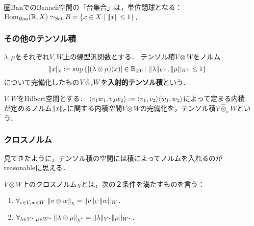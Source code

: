 \documentclass[uplatex,dvipdfmx]{jsreport}
\begin{document}
\begin{lemma}
    圏BanでのBanach空間の「台集合」は，単位閉球となる：
    $\mathrm{Hom}_{\mathrm{Ban}}(\mathbb{R},X)\simeq_{\mathrm{Set}} B=\left\{x\in X\mid\|x\|\le 1\right\}$．
\end{lemma}

\subsubsection{その他のテンソル積}

\begin{definition}
    $\lambda,\mu$をそれぞれ$V,W$上の線型汎関数とする．
    テンソル積$V\otimes W$をノルム
    \[\|x\|_\epsilon:=\sup\left\{\lvert(\lambda\otimes\mu)(x)\rvert\in\mathbb{R}_{\ge 0}\;\middle|\;\|\lambda\|_{V^*},\|\mu\|_{W^*}\le 1\right\}\]
    について完備化したもの$V\hat{\otimes}_\epsilon W$を\textbf{入射的テンソル積}という．
\end{definition}

\begin{definition}
    $V,W$をHilbert空間とする．
    $\langle v_1w_1,v_2w_2\rangle:=\langle v_1,v_2\rangle\langle w_1,w_2\rangle$によって定まる内積が定めるノルム$\|x\|_\sigma$に関する内積空間$V\otimes W$の完備化を，テンソル積$V\hat{\otimes}_\sigma W$という．
\end{definition}

\subsubsection{クロスノルム}

\begin{tcolorbox}[colframe=ForestGreen, colback=ForestGreen!10!white,breakable,colbacktitle=ForestGreen!40!white,coltitle=black,fonttitle=\bfseries\sffamily,
title=]
    見てきたように，テンソル積の空間には積によってノルムを入れるのがreasonableに思える．
\end{tcolorbox}

\begin{definition}
    $V\otimes W$上のクロスノルム$\chi$とは，次の２条件を満たすものを言う：
    \begin{enumerate}
        \item $\forall_{v\in V,w\in W}\;\|v\otimes w\|_\chi=\|v\|_V\|w\|_W$．
        \item $\forall_{\lambda\in V^*,\mu\in W^*}\;\|\lambda\otimes\mu\|_{\chi^*}=\|\lambda\|_{V^*}\|\mu\|_{W^*}$．
    \end{enumerate}
\end{definition}
\end{document}
